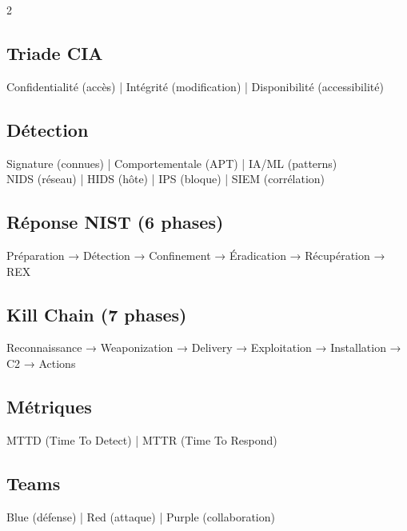 \documentclass[9pt,a4paper]{extarticle}
\begin{document}
\begin{multicols}{2}
\subsection*{Triade CIA}
Confidentialité (accès) | Intégrité (modification) | Disponibilité (accessibilité)

\subsection*{Détection}
Signature (connues) | Comportementale (APT) | IA/ML (patterns)\\
NIDS (réseau) | HIDS (hôte) | IPS (bloque) | SIEM (corrélation)

\subsection*{Réponse NIST (6 phases)}
Préparation → Détection → Confinement → Éradication → Récupération → REX

\subsection*{Kill Chain (7 phases)}
Reconnaissance → Weaponization → Delivery → Exploitation → Installation → C2 → Actions

\subsection*{Métriques}
MTTD (Time To Detect) | MTTR (Time To Respond)

\subsection*{Teams}
Blue (défense) | Red (attaque) | Purple (collaboration)

\end{multicols}
\end{document}
